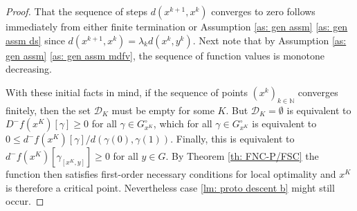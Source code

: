 \documentclass{article}
\theoremstyle{plain}\newtheorem{theorem}{Theorem}[section]
\theoremstyle{plain}\newtheorem{definition}[theorem]{Definition}
\theoremstyle{plain}\newtheorem{lemma}[theorem]{Lemma}
\theoremstyle{definition}\newtheorem{remark}[theorem]{Remark}
\theoremstyle{definition}\newtheorem{example}[theorem]{Example}
\theoremstyle{plain}\newtheorem{proposition}[theorem]{Proposition}
\theoremstyle{plain}\newtheorem{inference}[theorem]{Inference}
\theoremstyle{plain}\newtheorem{corollary}[theorem]{Corollary}
\theoremstyle{plain}\newtheorem{assumption}[theorem]{Assumption}
\newcommand{\bbN}{\mathbb{N}}
\newcommand{\Dcal}{{\mathcal D}}
\begin{document}
\begin{proof}
    That the sequence of steps $d(x^{k+1},x^k)$ converges to zero follows immediately from either finite termination or Assumption \ref{as: gen assm} \eqref{as: gen assm ds} since $d(x^{k+1},x^k)=\lambda_kd(x^k,y^k)$. Next note that by Assumption \ref{as: gen assm} \eqref{as: gen assm mdfv}, the sequence of function values is monotone decreasing.

    With these initial facts in mind, if the sequence of points $(x^k)_{k\in\bbN}$ converges finitely, then the set $\Dcal_K$ must be empty for some $K$. But $\Dcal_K=\emptyset$ is equivalent to $D^-f(x^K)[\gamma]\geq 0$ for all $\gamma\in G^\circ_{x^K}$, which  for all $\gamma\in G^\circ_{x^K}$ is equivalent to $0\leq d^-f(x^K)[\gamma]/d(\gamma(0), \gamma(1))$. Finally, this is equivalent to $d^-f(x^K)[\gamma_{[x^K,y]}]\geq 0$ for all $y\in G$. By Theorem \ref{th: FNC-P/FSC} the function then satisfies first-order necessary conditions for local optimality and $x^K$ is therefore a critical point. Nevertheless case \eqref{lm: proto descent b} might still occur.


\end{proof}
\end{document}
